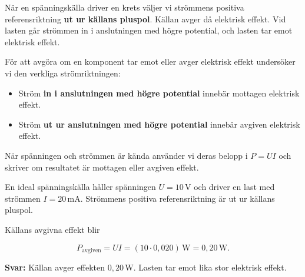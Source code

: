 \documentclass[
  swedish,
  11pt,
  a4paper,
  DIV=11,
  numbers=noendperiod,
  twoside,
  open=any]{scrreprt}
\providecommand{\tightlist}{%
  \setlength{\itemsep}{0pt}\setlength{\parskip}{0pt}}
\begin{document}
När en spänningskälla driver en krets väljer vi strömmens positiva
referensriktning \textbf{ut ur källans pluspol}. Källan avger då
elektrisk effekt. Vid lasten går strömmen in i anslutningen med högre
potential, och lasten tar emot elektrisk effekt.

För att avgöra om en komponent tar emot eller avger elektrisk effekt
undersöker vi den verkliga strömriktningen:

\begin{itemize}
\tightlist
\item
  Ström \textbf{in i anslutningen med högre potential} innebär mottagen
  elektrisk effekt.
\item
  Ström \textbf{ut ur anslutningen med högre potential} innebär avgiven
  elektrisk effekt.
\end{itemize}

När spänningen och strömmen är kända använder vi deras belopp i
\(P = UI\) och skriver om resultatet är mottagen eller avgiven effekt.

\begin{tcolorbox}[enhanced jigsaw, arc=.35mm, bottomrule=.15mm, bottomtitle=1mm, breakable, colback=white, colbacktitle=quarto-callout-note-color!10!white, colframe=quarto-callout-note-color-frame, coltitle=black, left=2mm, leftrule=.75mm, opacityback=0, opacitybacktitle=0.6, rightrule=.15mm, title={Exempel: en spänningskälla avger effekt}, titlerule=0mm, toprule=.15mm, toptitle=1mm]

En ideal spänningskälla håller spänningen \(U = 10\,\mathrm{V}\) och
driver en last med strömmen \(I = 20\,\mathrm{mA}\). Strömmens positiva
referensriktning är ut ur källans pluspol.

Källans avgivna effekt blir

\[
P_\mathrm{avgiven} = UI
= (10 \cdot 0{,}020)\,\mathrm{W}
= 0{,}20\,\mathrm{W}.
\]

\textbf{Svar:} Källan avger effekten \(0{,}20\,\mathrm{W}\). Lasten tar
emot lika stor elektrisk effekt.

\end{tcolorbox}
\end{document}
